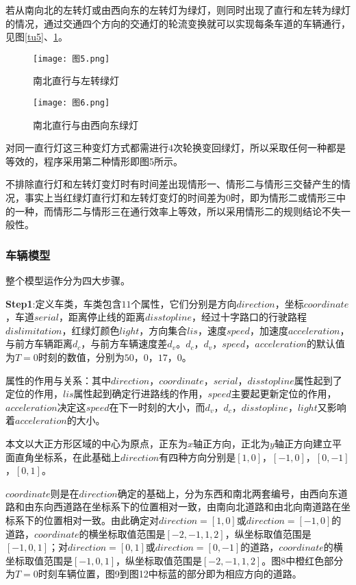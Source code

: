 \documentclass[a4paper,12pt]{article}
\numberwithin{equation}{section}
\begin{document}
	若从南向北的左转灯或由西向东的左转灯为绿灯，则同时出现了直行和左转为绿灯的情况，通过交通四个方向的交通灯的轮流变换就可以实现每条车道的车辆通行，见图\ref{tu5}、\ref{tu6}。\par
	\begin{figure}[H]
		\centering
		\begin{minipage}[t]{0.48\textwidth}
			\centering
			\texttt{[image: 图5.png]}
			\caption{南北直行与左转绿灯}
			\label{tu5}
		\end{minipage}
		\begin{minipage}[t]{0.48\textwidth}
			\centering
			\texttt{[image: 图6.png]}
			\caption{南北直行与由西向东绿灯}
			\label{tu6}
		\end{minipage}
	\end{figure}
	对同一直行灯这三种变灯方式都需进行$4$次轮换变回绿灯，所以采取任何一种都是等效的，程序采用第二种情形即图5所示。\par
	不排除直行灯和左转灯变灯时有时间差出现情形一、情形二与情形三交替产生的情况，事实上当红绿灯直行灯和左转灯变灯的时间差为0时，即为情形二或情形三中的一种，而情形二与情形三在通行效率上等效，所以采用情形二的规则结论不失一般性。\par
	
	\subsubsection{车辆模型}
	整个模型运作分为四大步骤。\par
	\textbf{Step1}:定义车类，车类包含$11$个属性，它们分别是方向$direction$，坐标$coordinate$，车道$serial$，距离停止线的距离$disstopline$，经过十字路口的行驶路程$dislimitation$，红绿灯颜色$light$，方向集合$lis$，速度$speed$，加速度$acceleration$，与前方车辆距离$d_c$，与前方车辆速度差$d_v$。$d_c$，$d_v$，$speed$，$acceleration$的默认值为$T=0$时刻的数值，分别为$50$，$0$，$17$，$0$。\par
	属性的作用与关系：其中$direction$，$coordinate$，$serial$，$disstopline$属性起到了定位的作用，$lis$属性起到确定行进路线的作用，$speed$主要起更新定位的作用，$acceleration$决定这$speed$在下一时刻的大小，而$d_v$，$d_c$，$disstopline$，$light$又影响着$acceleration$的大小。\par
	本文以大正方形区域的中心为原点，正东为$x$轴正方向，正北为$y$轴正方向建立平面直角坐标系，在此基础上$direction$有四种方向分别是$[1,0]$，$[-1,0]$，$[0,-1]$，$[0,1]$。\par
	$coordinate$则是在$direction$确定的基础上，分为东西和南北两套编号，由西向东道路和由东向西道路在坐标系下的位置相对一致，由南向北道路和由北向南道路在坐标系下的位置相对一致。由此确定对$direction=[1,0]$或$direction=[-1,0]$的道路，$coordinate$的横坐标取值范围是$[-2,-1,1,2]$，纵坐标取值范围是$[-1,0,1]$；对$direction=[0,1]$或$direction=[0,-1]$的道路，$coordinate$的横坐标取值范围是$[-1,0,1]$，纵坐标取值范围是$[-2,-1,1,2]$。图8中橙红色部分为$T=0$时刻车辆位置，图9到图12中标蓝的部分即为相应方向的道路。\par
	
\end{document}
